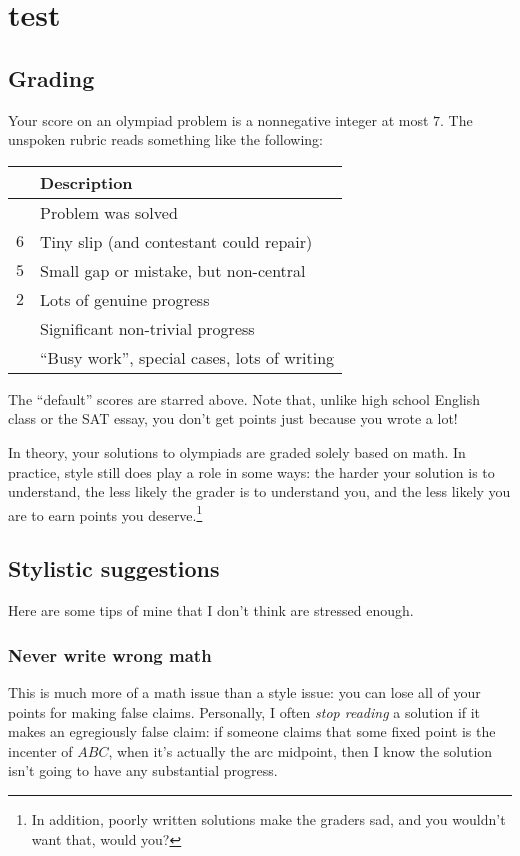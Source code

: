 \chapter{test}
\section{Grading}
Your score on an olympiad problem is a nonnegative integer at most $7$.
The unspoken rubric reads something like the following:
\begin{center}
\begin{tabular}[h]{ll}
	& Description \\ \hline
	\boldmath{$7^\ast$} & Problem was solved \\
	$6$ & Tiny slip (and contestant could repair) \\
	$5$ & Small gap or mistake, but non-central \\ \hline
	$2$ & Lots of genuine progress \\
	\boldmath{$1^\ast$} & Significant non-trivial progress \\
	\boldmath{$0^\ast$} & ``Busy work'', special cases, lots of writing
\end{tabular}
\end{center}
The ``default'' scores are starred above.
Note that, unlike high school English class or the SAT essay,
you don't get points just because you wrote a lot!

In theory, your solutions to olympiads are graded solely based on math.
In practice, style still does play a role in some ways:
the harder your solution is to understand,
the less likely the grader is to understand you,
and the less likely you are to earn points you deserve.\footnote{In addition,
	poorly written solutions make the graders sad,
	and you wouldn't want that, would you?}

\section{Stylistic suggestions}
Here are some tips of mine that I don't think are stressed enough.

\subsection{Never write wrong math}
This is much more of a math issue than a style issue:
you can lose all of your points for making false claims.
Personally, I often \emph{stop reading} a solution if it makes
an egregiously false claim: if someone claims that some fixed
point is the incenter of $ABC$,
when it's actually the arc midpoint,
then I know the solution isn't going to have any substantial progress.

